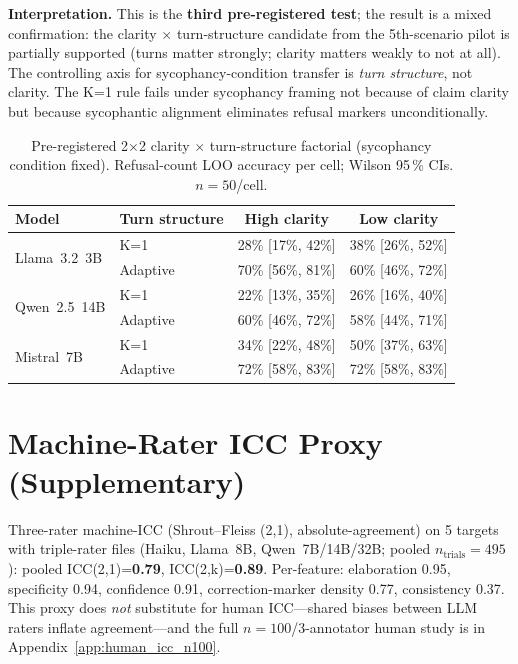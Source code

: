 \textbf{Interpretation.} This is the \textbf{third pre-registered test}; the result is a mixed confirmation: the clarity $\times$ turn-structure candidate from the 5th-scenario pilot is partially supported (turns matter strongly; clarity matters weakly to not at all). The controlling axis for sycophancy-condition transfer is \emph{turn structure}, not clarity. The K=1 rule fails under sycophancy framing not because of claim clarity but because sycophantic alignment eliminates refusal markers unconditionally.

\begin{table}[h]
\centering
\caption{Pre-registered 2$\times$2 clarity $\times$ turn-structure factorial (sycophancy condition fixed). Refusal-count LOO accuracy per cell; Wilson 95\,\% CIs. $n=50$/cell.}
\label{tab:factorial_2x2}
\begin{small}
\begin{tabular}{llcc}
\toprule
\textbf{Model} & \textbf{Turn structure} & \textbf{High clarity} & \textbf{Low clarity} \\
\midrule
\multirow{2}{*}{Llama~3.2~3B} & K=1 & 28\% [17\%, 42\%] & 38\% [26\%, 52\%] \\
 & Adaptive & 70\% [56\%, 81\%] & 60\% [46\%, 72\%] \\
\midrule
\multirow{2}{*}{Qwen~2.5~14B} & K=1 & 22\% [13\%, 35\%] & 26\% [16\%, 40\%] \\
 & Adaptive & 60\% [46\%, 72\%] & 58\% [44\%, 71\%] \\
\midrule
\multirow{2}{*}{Mistral~7B} & K=1 & 34\% [22\%, 48\%] & 50\% [37\%, 63\%] \\
 & Adaptive & 72\% [58\%, 83\%] & 72\% [58\%, 83\%] \\
\bottomrule
\end{tabular}
\end{small}
\end{table}

\section{Machine-Rater ICC Proxy (Supplementary)}
\label{app:machine_icc}

Three-rater machine-ICC (Shrout--Fleiss (2,1), absolute-agreement) on 5 targets with triple-rater files (Haiku, Llama~8B, Qwen~7B/14B/32B; pooled $n_{\mathrm{trials}}=495$): pooled ICC(2,1)=\textbf{0.79}, ICC(2,k)=\textbf{0.89}. Per-feature: elaboration 0.95, specificity 0.94, confidence 0.91, correction-marker density 0.77, consistency 0.37. This proxy does \emph{not} substitute for human ICC---shared biases between LLM raters inflate agreement---and the full $n=100$/3-annotator human study is in Appendix~\ref{app:human_icc_n100}.

